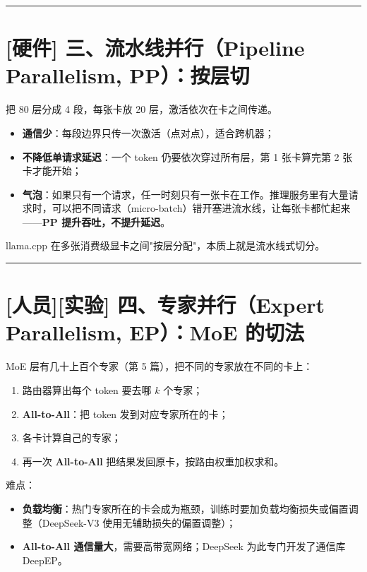 \vspace{0.8em}\hrule\vspace{0.8em}

\section{[硬件] 三、流水线并行（Pipeline Parallelism, PP）：按层切}

把 80 层分成 4 段，每张卡放 20 层，激活依次在卡之间传递。
\begin{itemize}
  \item \textbf{通信少}：每段边界只传一次激活（点对点），适合跨机器；
  \item \textbf{不降低单请求延迟}：一个 token 仍要依次穿过所有层，第 1 张卡算完第 2 张卡才能开始；
  \item \textbf{气泡}：如果只有一个请求，任一时刻只有一张卡在工作。推理服务里有大量请求时，可以把不同请求（micro-batch）错开塞进流水线，让每张卡都忙起来——\textbf{PP 提升吞吐，不提升延迟}。
\end{itemize}

llama.cpp 在多张消费级显卡之间"按层分配"，本质上就是流水线式切分。

\vspace{0.8em}\hrule\vspace{0.8em}

\section{[人员][实验] 四、专家并行（Expert Parallelism, EP）：MoE 的切法}

MoE 层有几十上百个专家（第 5 篇），把不同的专家放在不同的卡上：
\begin{enumerate}
  \item 路由器算出每个 token 要去哪 $k$ 个专家；
  \item \textbf{All-to-All}：把 token 发到对应专家所在的卡；
  \item 各卡计算自己的专家；
  \item 再一次 \textbf{All-to-All} 把结果发回原卡，按路由权重加权求和。
\end{enumerate}

难点：
\begin{itemize}
  \item \textbf{负载均衡}：热门专家所在的卡会成为瓶颈，训练时要加负载均衡损失或偏置调整（DeepSeek-V3 使用无辅助损失的偏置调整）；
  \item \textbf{All-to-All 通信量大}，需要高带宽网络；DeepSeek 为此专门开发了通信库 DeepEP。
\end{itemize}

